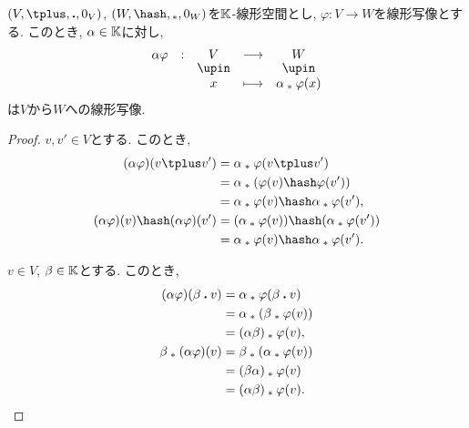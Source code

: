 \begin{example}
\label{prop:scalarprodislinear}
  $(V,\plus,\act,0_V)$, $(W,\pplus,\aact,0_W)$を$\mathbb{K}$-線形空間とし,
  $\varphi\colon V\to W$を線形写像とする.
  このとき, $\alpha \in \mathbb{K}$に対し,
  \begin{align*}
  \shazo{\alpha\varphi}{V}{W}
  {x}{\alpha\aact \varphi(x)}
  \end{align*}
  は$V$から$W$への線形写像.
\end{example}
\begin{proof}
$v,v'\in V$とする.
このとき,
\begin{align*}
(\alpha\varphi)(v\plus v')
&=\alpha\aact \varphi(v\plus v')\\
&=\alpha\aact (\varphi(v)\pplus \varphi(v'))\\
&=\alpha\aact\varphi(v)\pplus \alpha\aact\varphi(v'),
\\
(\alpha\varphi)(v)\pplus (\alpha\varphi)(v')
&=(\alpha\aact\varphi(v))\pplus (\alpha\aact\varphi(v'))\\
&=\alpha\aact\varphi(v)\pplus \alpha\aact\varphi(v').
\end{align*}

$v\in V$, $\beta\in \mathbb{K}$とする.
このとき,
\begin{align*}
(\alpha\varphi)(\beta\mathbin{\boldsymbol{.}} v)
&=\alpha\mathbin{{}_\ast} \varphi(\beta\mathbin{\boldsymbol{.}} v)\\
&=\alpha\mathbin{{}_\ast} (\beta\mathbin{{}_\ast}\varphi(v))\\
&=(\alpha\beta)\mathbin{{}_\ast}\varphi(v),
\\
\beta\mathbin{{}_\ast}(\alpha\varphi)(v)
&=\beta\mathbin{{}_\ast}(\alpha\mathbin{{}_\ast}\varphi(v))\\
&=(\beta\alpha)\mathbin{{}_\ast}\varphi(v)\\
&=(\alpha\beta)\mathbin{{}_\ast}\varphi(v).
\end{align*}
\end{proof}

